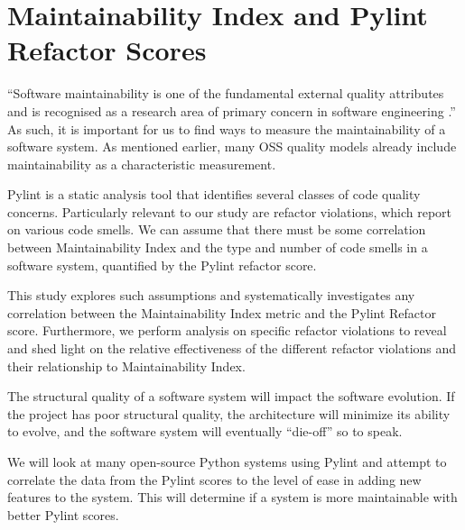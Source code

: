 \section{Maintainability Index and Pylint Refactor Scores}

``Software maintainability is one of the fundamental external quality attributes and is recognised as a research area of primary concern in software engineering \cite{alsolai:2019}.'' As such, it is important for us to find ways to measure the maintainability of a software system. As mentioned earlier, many OSS quality models already include maintainability as a characteristic measurement.

Pylint is a static analysis tool that identifies several classes of code quality concerns. Particularly relevant to our study are refactor violations, which report on various code smells. We can assume that there must be some correlation between Maintainability Index and the type and number of code smells in a software system, quantified by the Pylint refactor score.

This study explores such assumptions and systematically investigates any correlation between the Maintainability Index metric and the Pylint Refactor score. Furthermore, we perform analysis on specific refactor violations to reveal and shed light on the relative effectiveness of the different refactor violations and their relationship to Maintainability Index.

The structural quality of a software system will impact the software evolution. If the project has poor structural quality, the architecture will minimize its ability to evolve, and the software system will eventually ``die-off'' so to speak.

We will look at many open-source Python systems using Pylint and attempt to correlate the data from the Pylint scores to the level of ease in adding new features to the system. This will determine if a system is more maintainable with better Pylint scores.
